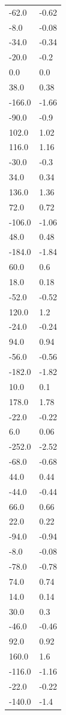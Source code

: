 \begin{longtable}{ll}
-62.0 & -0.62 \\
-8.0 & -0.08 \\
-34.0 & -0.34 \\
-20.0 & -0.2 \\
0.0 & 0.0 \\
38.0 & 0.38 \\
-166.0 & -1.66 \\
-90.0 & -0.9 \\
102.0 & 1.02 \\
116.0 & 1.16 \\
-30.0 & -0.3 \\
34.0 & 0.34 \\
136.0 & 1.36 \\
72.0 & 0.72 \\
-106.0 & -1.06 \\
48.0 & 0.48 \\
-184.0 & -1.84 \\
60.0 & 0.6 \\
18.0 & 0.18 \\
-52.0 & -0.52 \\
120.0 & 1.2 \\
-24.0 & -0.24 \\
94.0 & 0.94 \\
-56.0 & -0.56 \\
-182.0 & -1.82 \\
10.0 & 0.1 \\
178.0 & 1.78 \\
-22.0 & -0.22 \\
6.0 & 0.06 \\
-252.0 & -2.52 \\
-68.0 & -0.68 \\
44.0 & 0.44 \\
-44.0 & -0.44 \\
66.0 & 0.66 \\
22.0 & 0.22 \\
-94.0 & -0.94 \\
-8.0 & -0.08 \\
-78.0 & -0.78 \\
74.0 & 0.74 \\
14.0 & 0.14 \\
30.0 & 0.3 \\
-46.0 & -0.46 \\
92.0 & 0.92 \\
160.0 & 1.6 \\
-116.0 & -1.16 \\
-22.0 & -0.22 \\
-140.0 & -1.4 \\

\end{longtable}
